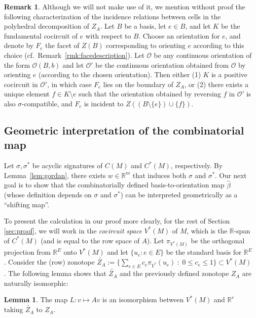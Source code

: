\documentclass[12pt]{amsart}
\newcommand{\RR}{\mathbb{R}}
\numberwithin{equation}{section}
\theoremstyle{definition}
\newtheorem{lemma}[theorem]{Lemma}
\newtheorem{remark}[theorem]{Remark}
\begin{document}
\begin{remark}
Although we will not make use of it, we mention without proof the following characterization of the incidence relations between cells in the polyhedral decomposition of $Z_A$.
Let $B$ be a basis, let $e\in B$, and let $K$ be the fundamental cocircuit of $e$ with respect to $B$. Choose an orientation for $e$, and denote by $F_e$ the facet of $Z(B)$ corresponding to orienting $e$ according to this choice (cf.~Remark~\ref{rmk:facedescription}).
Let $\mathcal{O}$ be any continuous orientation of the form $\mathcal{O}(B,b)$ and let $\mathcal{O'}$ be the continuous orientation obtained from $\mathcal{O}$ by orienting $e$ (according to the chosen orientation).
Then either (1) $K$ is a positive cocircuit in $\mathcal{O'}$, in which case $F_e$ lies on the boundary of $Z_A$, or (2) there exists a unique element $f\in K\setminus e$ such that the orientation obtained by reversing $f$ in $\mathcal{O'}$ is also $\sigma$-compatible, and $F_e$ is incident to $Z((B\setminus\{e\})\cup\{f\})$.
\end{remark}


\subsection{Geometric interpretation of the combinatorial map}

Let $\sigma,\sigma^*$ be acyclic signatures of $C(M)$ and $C^*(M)$, respectively.  By Lemma~\ref{lem:gordan}, there exists $w \in {\mathbb R}^m$ that induces both $\sigma$ and $\sigma^*$.
Our next goal is to show that the combinatorially defined basis-to-orientation map $\hat{\beta}$ (whose definition depends on $\sigma$ and $\sigma^*$) can be interpreted geometrically as a ``shifting map''.

\medskip

To present the calculation in our proof more clearly, for the rest of Section \ref{sec:proof}, we will work in the {\em cocircuit space} $V^*(M)$ of $M$, which is the ${\mathbb R}$-span of $C^*(M)$ (and is equal to the row space of $A$). Let $\pi_{V^*(M)}$ be the orthogonal projection from $\RR^E$ onto $V^*(M)$ and let $\{u_e:e\in E\}$ be the standard basis for $\RR^E$. Consider the (row) zonotope $\widetilde{Z_A} := \{ \sum_{e\in E} c_e \pi_{V^*}(u_e) \; : \; 0 \leq c_e \leq 1 \}\subset V^*(M)$.
The following lemma shows that $\widetilde{Z_A}$ and the previously defined zonotope $Z_A$ are naturally isomorphic:

\begin{lemma}
The map $L:v\mapsto Av$ is an isomorphism between $V^*(M)$ and $\RR^r$ taking $\widetilde{Z_A}$ to $Z_A$.
\end{lemma}
\end{document}
